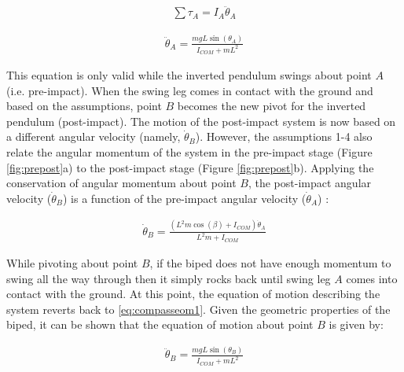 \begin{equation}
	\begin{aligned}
		\sum {{\tau _A} = {I_A}} {{\ddot \theta }_A}
	\end{aligned}
\end{equation}

\begin{equation} \label{eq:compasseom1}
	\begin{aligned}
		{{\ddot \theta }_A} = \frac{{mgL\sin ({\theta _A})}}{{{I_{COM}} + m{L^2}}}
	\end{aligned}
\end{equation}

This equation is only valid while the inverted pendulum swings about point $A$ (i.e. pre-impact). When the swing leg comes in contact with the ground and based on the assumptions, point $B$ becomes the new pivot for the inverted pendulum (post-impact). The motion of the post-impact system is now based on a different angular velocity (namely, $\dot{\theta}_B$). However, the assumptions 1-4 also relate the angular momentum of the system in the pre-impact stage (Figure \ref{fig:prepost}a) to the post-impact stage (Figure \ref{fig:prepost}b). Applying the conservation of angular momentum about point $B$, the post-impact angular velocity ($\dot{\theta}_B$) is a function of the pre-impact angular velocity ($\dot{\theta}_A$) \cite{Wight:2008vt}: 

\begin{equation}
	\begin{aligned}
		{\dot \theta _B} = \frac{{({L^2}m\cos (\beta ) + {I_{COM}}){{\dot \theta }_A}}}{{{L^2}m + {I_{COM}}}}
	\end{aligned}
\end{equation}

While pivoting about point $B$, if the biped does not have enough momentum to swing all the way through then it simply rocks back until swing leg $A$ comes into contact with the ground. At this point, the equation of motion describing the system reverts back to \eqref{eq:compasseom1}. Given the geometric properties of the biped, it can be shown that the equation of motion about point $B$ is given by: 

\begin{equation} \label{eq:compasseom2}
	\begin{aligned}
		{\ddot \theta _B} = \frac{{mgL\sin ({\theta _B})}}{{{I_{COM}} + m{L^2}}} 
	\end{aligned}
\end{equation}


